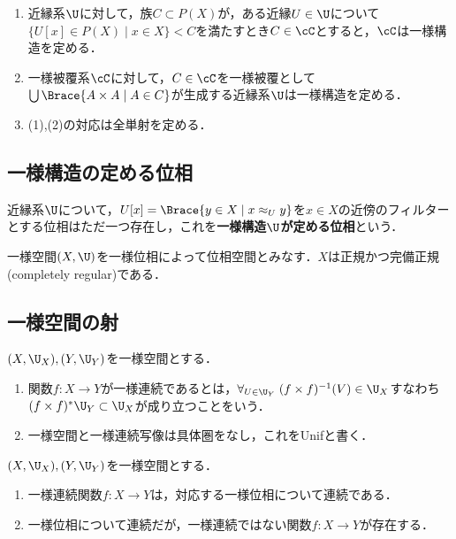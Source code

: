 \documentclass[uplatex,dvipdfmx]{jsreport}
\begin{document}
\begin{lemma}[２つの定義の同値性]\mbox{}
    \begin{enumerate}
        \item 近縁系$\U$に対して，族$C\subset P(X)$が，ある近縁$U\in\U$について$\{U[x]\in P(X)\mid x\in X\}<C$を満たすとき$C\in\cC$とすると，$\cC$は一様構造を定める．
        \item 一様被覆系$\cC$に対して，$C\in\cC$を一様被覆として$\bigcup\Brace{A\times A\mid A\in C}$が生成する近縁系$\U$は一様構造を定める．
        \item (1),(2)の対応は全単射を定める．
    \end{enumerate}
\end{lemma}

\subsection{一様構造の定める位相}

\begin{definition}
    近縁系$\U$について，$U[x]=\Brace{y\in X\mid x\approx_Uy}$を$x\in X$の近傍のフィルターとする位相はただ一つ存在し，これを\textbf{一様構造$\U$が定める位相}という．
\end{definition}

\begin{proposition}
    一様空間$(X,\U)$を一様位相によって位相空間とみなす．$X$は正規かつ完備正規(completely regular)である．
\end{proposition}

\subsection{一様空間の射}

\begin{definition}
    $(X,\U_X),(Y,\U_Y)$を一様空間とする．
    \begin{enumerate}
        \item 関数$f:X\to Y$が一様連続であるとは，$\forall_{U\in\U_Y}\;(f\times f)^{-1}(V)\in\U_X$すなわち$(f\times f)^*\U_Y\subset\U_X$が成り立つことをいう．
        \item 一様空間と一様連続写像は具体圏をなし，これをUnifと書く．
    \end{enumerate}
\end{definition}

\begin{lemma}
    $(X,\U_X),(Y,\U_Y)$を一様空間とする．
    \begin{enumerate}
        \item 一様連続関数$f:X\to Y$は，対応する一様位相について連続である．
        \item 一様位相について連続だが，一様連続ではない関数$f:X\to Y$が存在する．
    \end{enumerate}
\end{lemma}
\end{document}
